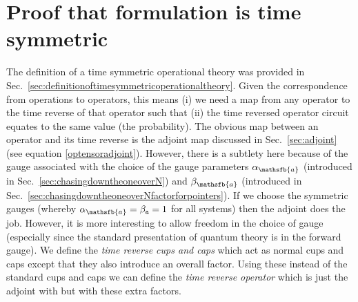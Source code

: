 \documentclass[10pt]{article}
\begin{document}
\section{Proof that formulation is time symmetric}\label{sec:proofthatformulationistimesymmetric}

The definition of a time symmetric operational theory was provided in Sec.\ \ref{sec:definitionoftimesymmetricoperationaltheory}.  Given the correspondence from operations to operators, this means (i) we need a map from any operator to the time reverse of that operator such that (ii) the time reversed operator circuit equates to the same value (the probability).  The obvious map between an operator and its time reverse is the adjoint map discussed in Sec.\ \ref{sec:adjoint} (see equation \eqref{optensoradjoint}).  However, there is a subtlety here because of the gauge associated with the choice of the gauge parameters $\alpha_\mathsfb{a}$ (introduced in Sec.\ \ref{sec:chasingdowntheoneoverN}) and $\beta_\mathsfb{a}$ (introduced in Sec.\ \ref{sec:chasingdowntheoneoverNfactorforpointers}).   If we choose the symmetric gauges (whereby $\alpha_\mathsfb{a}=\beta_\mathtt{a}=1$ for all systems) then the adjoint does the job.  However, it is more interesting to allow freedom in the choice of gauge (especially since the standard presentation of quantum theory is in the forward gauge).  We define the \emph{time reverse cups and caps} which act as normal cups and caps except that they also introduce an overall factor.  Using these instead of the standard cups and caps we can define the \emph{time reverse operator} which is just the adjoint with but with these extra factors.
\end{document}

